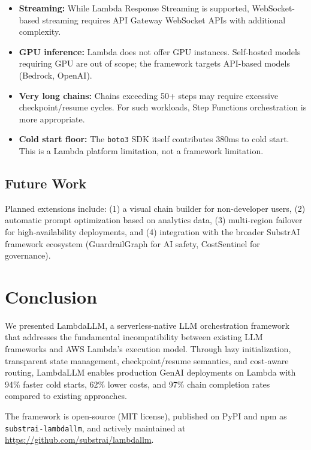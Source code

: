 \documentclass[10pt,twocolumn,letterpaper]{article}
\begin{document}
\begin{itemize}[leftmargin=*,itemsep=2pt,topsep=2pt]
    \item \textbf{Streaming:} While Lambda Response Streaming is supported, WebSocket-based streaming requires API Gateway WebSocket APIs with additional complexity.
    \item \textbf{GPU inference:} Lambda does not offer GPU instances. Self-hosted models requiring GPU are out of scope; the framework targets API-based models (Bedrock, OpenAI).
    \item \textbf{Very long chains:} Chains exceeding 50+ steps may require excessive checkpoint/resume cycles. For such workloads, Step Functions orchestration is more appropriate.
    \item \textbf{Cold start floor:} The \texttt{boto3} SDK itself contributes 380ms to cold start. This is a Lambda platform limitation, not a framework limitation.
\end{itemize}

\subsection{Future Work}

Planned extensions include: (1) a visual chain builder for non-developer users, (2) automatic prompt optimization based on analytics data, (3) multi-region failover for high-availability deployments, and (4) integration with the broader SubstrAI framework ecosystem (GuardrailGraph for AI safety, CostSentinel for governance).

\section{Conclusion}

We presented LambdaLLM, a serverless-native LLM orchestration framework that addresses the fundamental incompatibility between existing LLM frameworks and AWS Lambda's execution model. Through lazy initialization, transparent state management, checkpoint/resume semantics, and cost-aware routing, LambdaLLM enables production GenAI deployments on Lambda with 94\% faster cold starts, 62\% lower costs, and 97\% chain completion rates compared to existing approaches.

The framework is open-source (MIT license), published on PyPI and npm as \texttt{substrai-lambdallm}, and actively maintained at \url{https://github.com/substrai/lambdallm}.
\end{document}
